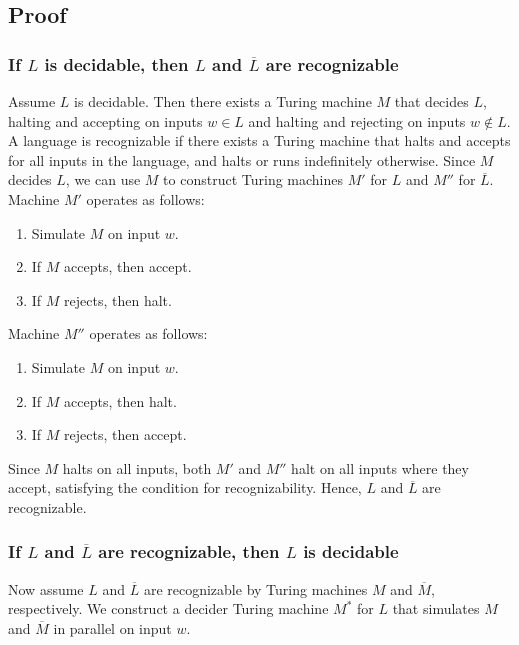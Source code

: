 \documentclass{article}
\begin{document}
\subsection*{Proof}

\subsubsection*{ If \( L \) is decidable, then \( L \) and \( \overline{L} \) are recognizable}
Assume \( L \) is decidable. Then there exists a Turing machine \( M \) that decides \( L \), halting and accepting on inputs \( w \in L \) and halting and rejecting on inputs \( w \notin L \). A language is recognizable if there exists a Turing machine that halts and accepts for all inputs in the language, and halts or runs indefinitely otherwise. Since \( M \) decides \( L \), we can use \( M \) to construct Turing machines \( M' \) for \( L \) and \( M'' \) for \( \overline{L} \).
\newpage
Machine \( M' \) operates as follows:
\begin{enumerate}
    \item Simulate \( M \) on input \( w \).
    \item If \( M \) accepts, then accept.
    \item If \( M \) rejects, then halt.
\end{enumerate}

Machine \( M'' \) operates as follows:
\begin{enumerate}
    \item Simulate \( M \) on input \( w \).
    \item If \( M \) accepts, then halt.
    \item If \( M \) rejects, then accept.
\end{enumerate}

Since \( M \) halts on all inputs, both \( M' \) and \( M'' \) halt on all inputs where they accept, satisfying the condition for recognizability. Hence, \( L \) and \( \overline{L} \) are recognizable.

\subsubsection*{ If \( L \) and \( \overline{L} \) are recognizable, then \( L \) is decidable}
Now assume \( L \) and \( \overline{L} \) are recognizable by Turing machines \( M \) and \( \overline{M} \), respectively. We construct a decider Turing machine \( M^* \) for \( L \) that simulates \( M \) and \( \overline{M} \) in parallel on input \( w \).
\end{document}

